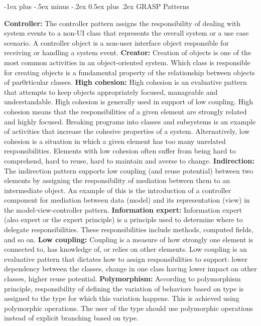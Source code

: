 \documentclass[a4paper, fontsize=6pt]{scrartcl}
\makeatletter
\renewcommand{\section}{\@startsection{section}{1}{0mm}%
    {-1ex plus -.5ex minus -.2ex}%
    {0.5ex plus .2ex}%
    {\normalfont\large\bfseries}}
\makeatother
\begin{document}
\begin{multicols*}{5}
\section{GRASP Patterns}

\textbf{Controller:} The controller pattern assigns the responsibility of dealing with system events to a non-UI class that represents the overall system or a use case scenario. A controller object is a non-user interface object responsible for receiving or handling a system event.
\textbf{Creator:} Creation of objects is one of the most common activities in an object-oriented system. Which class is responsible for creating objects is a fundamental property of the relationship between objects of par0rticular classes.
\textbf{High cohesion:} High cohesion is an evaluative pattern that attempts to keep objects appropriately focused, manageable and understandable. High cohesion is generally used in support of low coupling. High cohesion means that the responsibilities of a given element are strongly related and highly focused. Breaking programs into classes and subsystems is an example of activities that increase the cohesive properties of a system. Alternatively, low cohesion is a situation in which a given element has too many unrelated responsibilities. Elements with low cohesion often suffer from being hard to comprehend, hard to reuse, hard to maintain and averse to change.
\textbf{Indirection:} The indirection pattern supports low coupling (and reuse potential) between two elements by assigning the responsibility of mediation between them to an intermediate object. An example of this is the introduction of a controller component for mediation between data (model) and its representation (view) in the model-view-controller pattern.
\textbf{Information expert:} Information expert (also expert or the expert principle) is a principle used to determine where to delegate responsibilities. These responsibilities include methods, computed fields, and so on.
\textbf{Low coupling:} Coupling is a measure of how strongly one element is connected to, has knowledge of, or relies on other elements. Low coupling is an evaluative pattern that dictates how to assign responsibilities to support: lower dependency between the classes, change in one class having lower impact on other classes, higher reuse potential.
\textbf{Polymorphism:} According to polymorphism principle, responsibility of defining the variation of behaviors based on type is assigned to the type for which this variation happens. This is achieved using polymorphic operations. The user of the type should use polymorphic operations instead of explicit branching based on type.

\end{multicols*}
\end{document}
